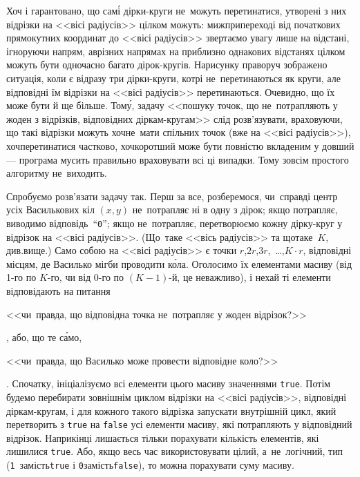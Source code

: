 Хоч і гарантовано, що сам\'{і} дірки-круги не~можуть перетинатися, утворені з них відрізки на <<вісі радіусів>> цілком можуть: ми\nolinebreak[2] ж\nolinebreak[2] при\nolinebreak[3] переході від початкових прямокутних координат до <<вісі радіусів>> звертаємо увагу лише на відстані, ігноруючи напрям, а\nolinebreak[2] в\nolinebreak[2] різних напрямах на приблизно однакових відстанях цілком можуть бути одночасно багато дірок-кругів. На\nolinebreak[3] рисунку праворуч зображено ситуація, коли є відразу три дірки-круги, котрі не~перетинаються як круги, але відповідні їм відрізки на <<вісі радіусів>> перетинаються. Очевидно, що їх може бути й ще більше.
% 
Том\'{у}, задачу <<пошуку точок, що не~потрапляють у жоден з відрізків, відповідних діркам-кругам>> слід розв'язувати, враховуючи, що такі відрізки можуть хоч\nolinebreak[2] не~мати спільних точок (вже на <<вісі радіусів>>), хоч\nolinebreak[3] перетинатися частково, хоч\nolinebreak[3] коротший може бути повністю вкладеним у довший\nolinebreak[3] --- програма мусить правильно враховувати всі ці випадки. Тому зовсім простого алгоритму не~виходить.

 Спробуємо розв'язати задачу так.
Перш за все, розберемося, чи~справді центр усіх Василькових кіл $(x,y)$ не~потрапляє ні в одну з дірок; якщо потрапляє, виводимо відповідь~``\texttt{0}''; якщо не~потрапляє, перетворюємо кожну дірку-круг у відрізок на <<вісі радіусів>>. (Що~таке <<вісь радіусів>> та що\nolinebreak[3] таке~$K$, див.\nolinebreak[3] вище.) Само собою на <<вісі радіусів>> є  точки $r$,\nolinebreak[2] $2r$,\nolinebreak[2] $3r$,~\dots{},\nolinebreak[3] $K\cdot r$, відповідні місцям, де Василько міг\nolinebreak[3] би проводити к\'{о}ла. Оголосимо їх елементами масиву (від \mbox{1-го} по \mbox{$K$-го}, чи від \mbox{0-го} по \mbox{${(K{-}1)}$-й}, це неважливо), і нехай ті елементи відповідають на питання \begin{slshape}<<чи~правда, що відповідна точка не~потрапляє у жоден відрізок?>>\end{slshape}, або, що те с\'{а}мо, \begin{slshape}<<чи~правда, що Василько може провести відповідне коло?>>\end{slshape}. Спочатку, ініціалізуємо всі елементи цього масиву значеннями \texttt{true}. Потім будемо перебирати зовнішнім циклом відрізки на <<вісі радіусів>>, відповідні діркам-кругам, і для кожного такого відрізка запускати внутрішній цикл, який перетворить з \texttt{true} на \texttt{false} усі елементи масиву, які потрапляють у відповідний відрізок. Наприкінці лишається тільки порахувати кількість елементів, які лишилися \texttt{true}. Або, якщо весь час використовувати цілий, а~не~логічний, тип (\texttt{1}~замість\nolinebreak[2] \texttt{true} і \texttt{0}\nolinebreak[3] замість\nolinebreak[2] \texttt{false}), то можна порахувати суму масиву.

